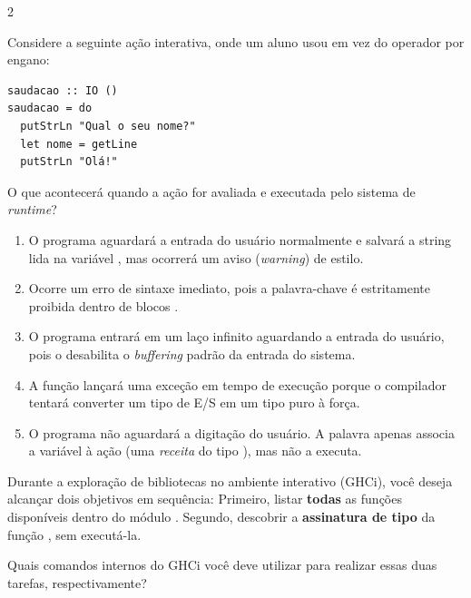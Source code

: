\documentclass[a4paper,10pt,brazil]{article}
\begin{document}
\begin{multicols}{2}
\begin{enumerate}
\end{enumerate}

Considere a seguinte ação interativa, onde um aluno usou  em vez do operador \haskellinline{<-} por engano:

\begin{verbatim}
saudacao :: IO ()
saudacao = do
  putStrLn "Qual o seu nome?"
  let nome = getLine
  putStrLn "Olá!"
\end{verbatim}

O que acontecerá quando a ação  for avaliada e executada pelo sistema de \emph{runtime}?

\begin{enumerate}
  \item O programa aguardará a entrada do usuário normalmente e salvará a string lida na variável , mas ocorrerá um aviso (\emph{warning}) de estilo.

  \item Ocorre um erro de sintaxe imediato, pois a palavra-chave  é estritamente proibida dentro de blocos .

  \item O programa entrará em um laço infinito aguardando a entrada do usuário, pois o  desabilita o \emph{buffering} padrão da entrada do sistema.

  \item A função  lançará uma exceção em tempo de execução porque o compilador tentará converter um tipo de E/S em um tipo puro à força.

  \item O programa não aguardará a digitação do usuário. A palavra  apenas associa a variável  à ação (uma \emph{receita} do tipo ), mas não a executa.


\end{enumerate}

Durante a exploração de bibliotecas no ambiente interativo (GHCi), você deseja alcançar dois objetivos em sequência:
Primeiro, listar \textbf{todas} as funções disponíveis dentro do módulo .
Segundo, descobrir a \textbf{assinatura de tipo} da função , sem executá-la.

Quais comandos internos do GHCi você deve utilizar para realizar essas duas tarefas, respectivamente?


\end{multicols}
\end{document}
